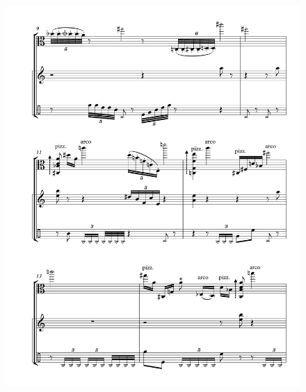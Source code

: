 \begin{figure}[htbp]
    \centering
	\includegraphics[width=6.5in]{figures/Viola_Percussion_2.pdf}
\end{figure}

